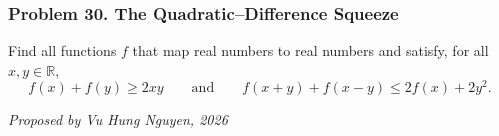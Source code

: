 \subsubsection*{Problem 30. The Quadratic--Difference Squeeze}

\begin{exercisebox}[medium]

Find all functions $f$ that map real numbers to real numbers and
satisfy, for all $x,y\in\mathbb R$,
\[
f(x)+f(y)\geq2xy
\qquad\text{and}\qquad
f(x+y)+f(x-y)\leq2f(x)+2y^2.
\]

\begin{flushright}
\textit{Proposed by Vu Hung Nguyen, 2026}
\end{flushright}


\end{exercisebox}